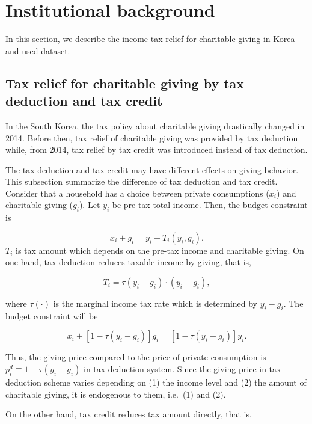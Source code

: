 \documentclass[ review  , 3p ]{elsarticle}
\begin{document}
  \hypertarget{institutional-background}{%
  \section{Institutional background}\label{institutional-background}}

  In this section, we describe the income tax relief for charitable giving in Korea and used dataset.

  \hypertarget{tax-relief-for-charitable-giving-by-tax-deduction-and-tax-credit}{%
  \subsection{Tax relief for charitable giving by tax deduction and tax credit}\label{tax-relief-for-charitable-giving-by-tax-deduction-and-tax-credit}}

  In the South Korea, the tax policy about charitable giving drastically changed in 2014. Before then, tax relief of charitable giving was provided by tax deduction while, from 2014, tax relief by tax credit was introduced instead of tax deduction.

  The tax deduction and tax credit may have different effects on giving behavior. This subsection summarize the difference of tax deduction and tax credit.
  Consider that a household has a choice between private consumptions (\(x_i\)) and charitable giving (\(g_i\)). Let \(y_i\) be pre-tax total income.
  Then, the budget constraint is

  \[
      x_i + g_i = y_i - T_i(y_i, g_i).
  \]
  \(T_i\) is tax amount which depends on the pre-tax income and charitable giving.
  On one hand, tax deduction reduces taxable income by giving, that is,

  \[
      T_i = \tau(y_i - g_i) \cdot (y_i - g_i),
  \]

  where \(\tau(\cdot)\) is the marginal income tax rate which is determined by \(y_i - g_i\). The budget constraint will be

  \[
      x_i + [1 - \tau(y_i - g_i)]g_i = [1 - \tau(y_i - g_i)] y_i.
  \]

  Thus, the giving price compared to the price of private consumption is \(p_i^{d} \equiv 1 - \tau(y_i - g_i)\) in tax deduction system. Since the giving price in tax deduction scheme varies depending on (1) the income level and (2) the amount of charitable giving, it is endogenous to them, i.e.~(1) and (2).

  On the other hand, tax credit reduces tax amount directly, that is,
\end{document}
